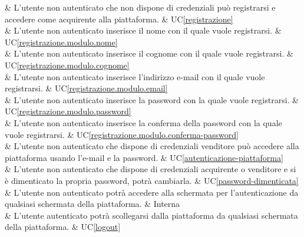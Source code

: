  & L'utente non autenticato che non dispone di credenziali può registrarsi e accedere come acquirente alla piattaforma. & UC\ref{registrazione} \\

 & L'utente non autenticato inserisce il nome con il quale vuole registrarsi. & UC\ref{registrazione.modulo.nome} \\

 & L'utente non autenticato inserisce il cognome con il quale vuole registrarsi. & UC\ref{registrazione.modulo.cognome} \\

 & L'utente non autenticato inserisce l'indirizzo e-mail con il quale vuole registrarsi. & UC\ref{registrazione.modulo.email} \\

 & L'utente non autenticato inserisce la password con la quale vuole registrarsi. & UC\ref{registrazione.modulo.password} \\

  & L'utente non autenticato inserisce la conferma della password con la quale vuole registrarsi. & UC\ref{registrazione.modulo.conferma-password} \\

 & L'utente non autenticato che dispone di credenziali venditore può accedere alla piattaforma usando l'e-mail e la password. & UC\ref{autenticazione-piattaforma} \\

 & L'utente non autenticato che dispone di credenziali acquirente o venditore e si è dimenticato la propria password, potrà cambiarla. & UC\ref{password-dimenticata} \\

 & L'utente non autenticato potrà accedere alla schermata per l'autenticazione da qualsiasi schermata della piattaforma. & Interna \\

 & L'utente autenticato potrà scollegarsi dalla piattaforma da qualsiasi schermata della piattaforma. & UC\ref{logout} \\
